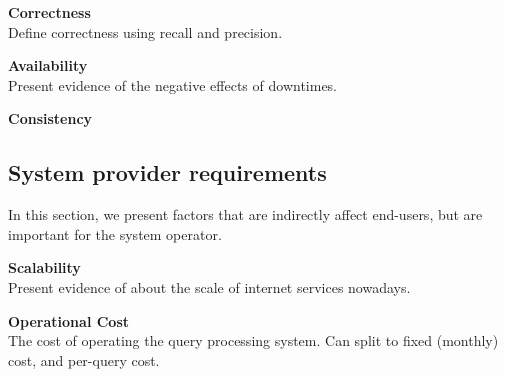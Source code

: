 \textbf{Correctness} \\
  Define correctness using recall and precision.

\textbf{Availability} \\
  Present evidence of the negative effects of downtimes.

\textbf{Consistency}

\subsection{System provider requirements}
In this section, we present factors that are indirectly affect end-users, but are important for the system operator.

\textbf{Scalability} \\
Present evidence of about the scale of internet services nowadays.

\textbf{Operational Cost} \\
The cost of operating the query processing system. Can split to fixed (monthly) cost, and per-query cost.



